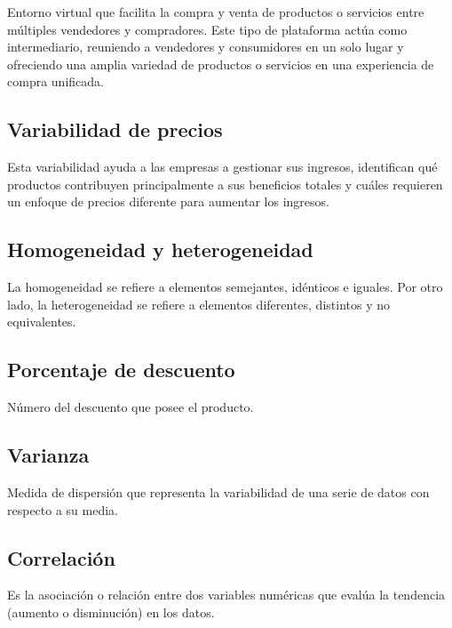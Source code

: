 \documentclass[oneside,11pt]{Latex/Classes/PhDthesisPSnPDF}
\begin{document}
Entorno virtual que facilita la compra y venta de productos o servicios
entre múltiples vendedores y compradores. Este tipo de plataforma actúa
como intermediario, reuniendo a vendedores y consumidores en un solo
lugar y ofreciendo una amplia variedad de productos o servicios en una
experiencia de compra unificada.\\

\subsection{Variabilidad de precios }

Esta variabilidad ayuda a las empresas a gestionar sus ingresos,
identifican qué productos contribuyen principalmente a sus beneficios
totales y cuáles requieren un enfoque de precios diferente para aumentar
los ingresos.\\

\subsection{Homogeneidad y heterogeneidad }

La homogeneidad se refiere a elementos semejantes, idénticos e iguales.
Por otro lado, la heterogeneidad se refiere a elementos diferentes,
distintos y no equivalentes.\\

\subsection{Porcentaje de descuento }

Número del descuento que posee el producto.\\

\subsection{Varianza  }

Medida de dispersión que representa la variabilidad de una serie de
datos con respecto a su media.\\

\subsection{Correlación  }

Es la asociación o relación entre dos variables numéricas que evalúa la
tendencia (aumento o disminución) en los datos.\\
\end{document}
